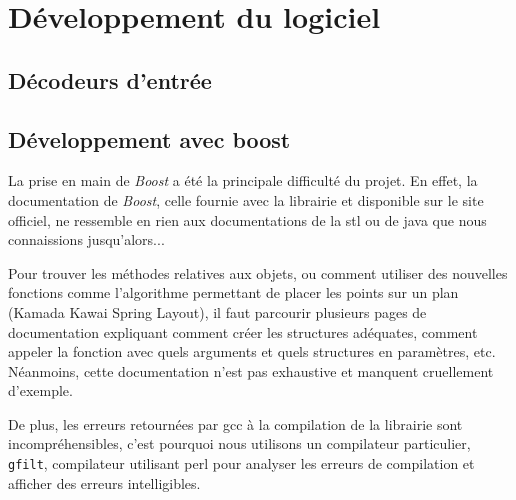 \section{Développement du logiciel}
\subsection{Décodeurs d'entrée}
\subsection{Développement avec boost}
La prise en main de \textit{Boost} a été la principale difficulté du projet. En effet, la documentation de \textit{Boost}, celle fournie avec la librairie et disponible sur le site officiel, ne ressemble en rien aux documentations de la stl ou de java que nous connaissions jusqu'alors...

Pour trouver les méthodes relatives aux objets, ou comment utiliser des nouvelles fonctions comme l'algorithme permettant de placer les points sur un plan (Kamada Kawai Spring Layout), il faut parcourir plusieurs pages de documentation expliquant comment créer les structures adéquates, comment appeler la fonction avec quels arguments et quels structures en paramètres, etc. Néanmoins, cette documentation n'est pas exhaustive et manquent cruellement d'exemple. 

De plus, les erreurs retournées par gcc à la compilation de la librairie sont incompréhensibles, c'est pourquoi nous utilisons un compilateur particulier, \verb|gfilt|, compilateur utilisant perl pour analyser les erreurs de compilation et afficher des erreurs intelligibles. 




